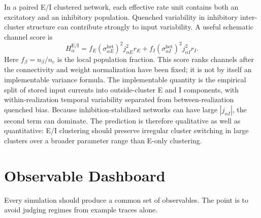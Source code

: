 In a paired E/I clustered network, each effective rate unit contains both an
excitatory and an inhibitory population. Quenched variability in inhibitory
inter-cluster structure can contribute strongly to input variability. A useful
schematic channel score is
\begin{equation}
    H_\alpha^{\mathrm{E/I}}
    =
    f_E
    (\sigma_{\alpha E}^{\mathrm{het}})^2
    j_{\alpha E}^2 r_E
    +
    f_I
    (\sigma_{\alpha I}^{\mathrm{het}})^2
    j_{\alpha I}^2 r_I.
    \label{eq:ch10-ei-heterogeneity-score}
\end{equation}
Here \(f_\beta=n_\beta/n_c\) is the local population fraction. This score ranks
channels after the connectivity and weight normalization have been fixed; it is
not by itself an implementable variance formula. The implementable quantity is
the empirical split of stored input currents into outside-cluster E and I
components, with within-realization temporal variability separated from
between-realization quenched bias.
Because inhibition-stabilized networks can have large \(|j_{\alpha I}|\), the
second term can dominate. The prediction is therefore qualitative as well as
quantitative: E/I clustering should preserve irregular cluster switching in
large clusters over a broader parameter range than E-only clustering.

\section{Observable Dashboard}
\label{sec:ch10-observable-dashboard}

Every simulation should produce a common set of observables. The point is to
avoid judging regimes from example traces alone.


